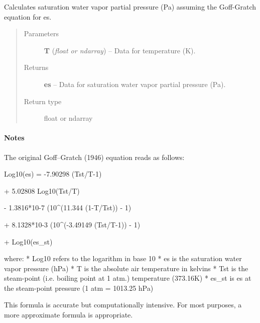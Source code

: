 \documentclass[letterpaper,10pt,english]{sphinxmanual}
\begin{document}
\begin{fulllineitems}
\label{atmos:atmos.equations.es_from_T_Goff_Gratch}
Calculates saturation water vapor partial pressure (Pa) assuming the Goff-Gratch
equation for es.
\begin{quote}\begin{description}
\item[{Parameters}] \leavevmode
\textbf{T} (\emph{float or ndarray}) -- Data for temperature (K).

\item[{Returns}] \leavevmode
\textbf{es} --
Data for saturation water vapor partial pressure (Pa).

\item[{Return type}] \leavevmode
float or ndarray

\end{description}\end{quote}
\paragraph{Notes}

The original Goff–Gratch (1946) equation reads as follows:

\begin{DUlineblock}{0em}
\item[] Log10(es) = -7.90298 (Tst/T-1)
\item[]
\begin{DUlineblock}{\DUlineblockindent}
\item[] + 5.02808 Log10(Tst/T)
\item[] - 1.3816*10-7 (10\textasciicircum{}(11.344 (1-T/Tst)) - 1)
\item[] + 8.1328*10-3 (10\textasciicircum{}(-3.49149 (Tst/T-1)) - 1)
\item[] + Log10(es\_st)
\end{DUlineblock}
\end{DUlineblock}

where:
* Log10 refers to the logarithm in base 10
* es is the saturation water vapor pressure (hPa)
* T is the absolute air temperature in kelvins
* Tst is the steam-point (i.e. boiling point at 1 atm.) temperature (373.16K)
* es\_st is es at the steam-point pressure (1 atm = 1013.25 hPa)

This formula is accurate but computationally intensive. For most purposes,
a more approximate formula is appropriate.


\end{fulllineitems}
\end{document}
